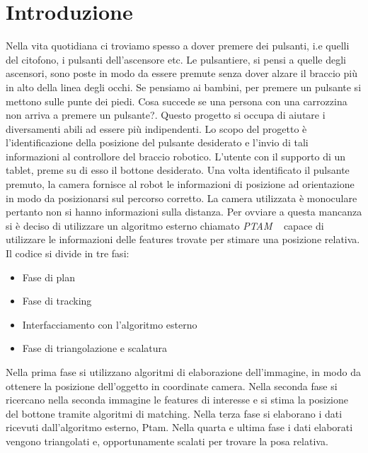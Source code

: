 
\chapter{Introduzione}
\label{chapter1}
Nella vita quotidiana ci troviamo spesso a dover premere dei pulsanti, i.e quelli del citofono, i pulsanti dell'ascensore etc. Le pulsantiere, si pensi a quelle degli ascensori, sono poste in modo da essere premute senza dover alzare il braccio più in alto della linea degli occhi. Se pensiamo ai bambini, per premere un pulsante si mettono sulle punte dei piedi. Cosa succede se una persona con una carrozzina non arriva a premere un pulsante?. Questo progetto si occupa di aiutare i diversamenti abili ad essere più indipendenti. Lo scopo del progetto è l'identificazione della posizione del pulsante desiderato e l'invio di tali informazioni al controllore del braccio robotico. L'utente con il supporto di un tablet, preme su di esso il bottone desiderato. Una volta identificato il pulsante premuto, la camera fornisce al robot le informazioni di posizione ad orientazione in modo da posizionarsi sul percorso corretto. La camera utilizzata è monoculare pertanto non si hanno informazioni sulla distanza. Per ovviare a questa mancanza si è deciso di utilizzare un algoritmo esterno chiamato \emph{PTAM} ~\cite{PTAM} capace di utilizzare le informazioni delle features trovate per stimare una posizione relativa.
Il codice si divide in tre fasi:
\begin{itemize}
\item Fase di plan
\item Fase di tracking
\item Interfacciamento con l'algoritmo esterno
\item Fase di triangolazione e scalatura
\end{itemize}
Nella prima fase si utilizzano algoritmi di elaborazione dell’immagine, in modo da ottenere la posizione
dell’oggetto in coordinate camera. Nella seconda fase si ricercano nella seconda immagine le features di interesse e si stima la posizione del bottone tramite algoritmi di matching. Nella terza fase si elaborano i dati ricevuti dall'algoritmo esterno, Ptam. Nella quarta e ultima fase i dati elaborati vengono triangolati e, opportunamente scalati per trovare la posa relativa.

